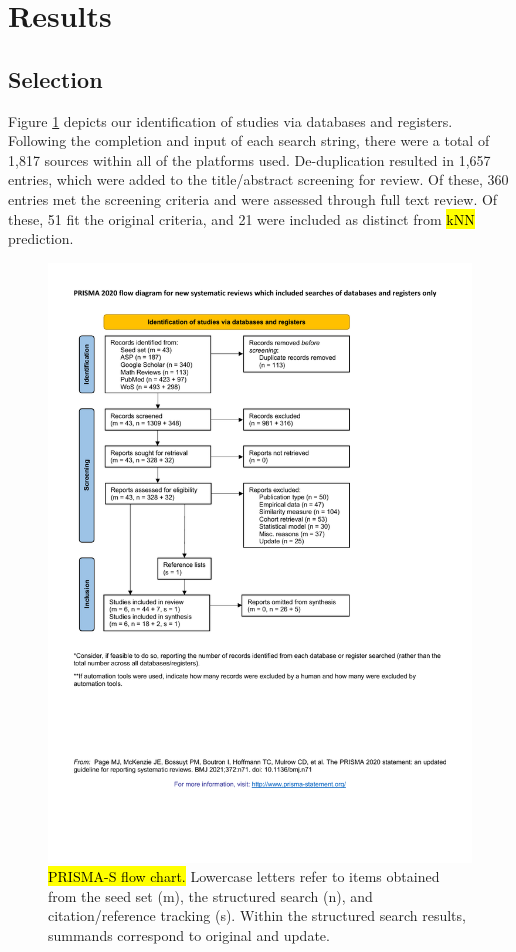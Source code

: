 \documentclass[sn-mathphys,Numbered,pdflatex]{sn-jnl}
\theoremstyle{remark}
\theoremstyle{definition}
\begin{document}
\section{Results}\label{results}

\subsection{Selection}\label{selection}

Figure \ref{fig:prisma} depicts our identification of studies via
databases and registers. Following the completion and input of each
search string, there were a total of 1,817 sources within all of the
platforms used. De-duplication resulted in 1,657 entries, which were
added to the title/abstract screening for review. Of these, 360 entries
met the screening criteria and were assessed through full text review.
Of these, 51 fit the original criteria, and 21 were included as distinct
from \hl{kNN} prediction.

\begin{figure}

{\centering \includegraphics[width=0.8\linewidth]{Fig1} 

}

\caption{\hl{PRISMA-S flow chart.}
 Lowercase letters refer to items obtained from
 the seed set (m),
 the structured search (n), and
 citation/reference tracking (s).
 Within the structured search results,
 summands correspond to original and update.}\label{fig:prisma}
\end{figure}
\end{document}
